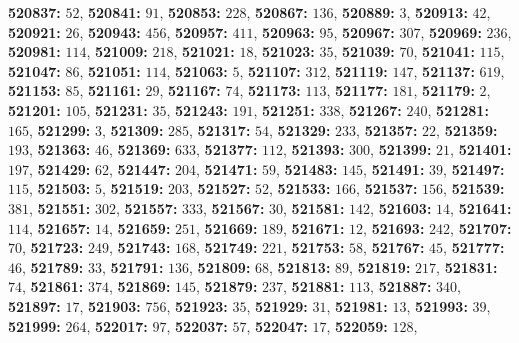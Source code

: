 \textsf{\bfseries 520837:} $52$, \textsf{\bfseries 520841:} $91$, \textsf{\bfseries 520853:} $228$, \textsf{\bfseries 520867:} $136$, \textsf{\bfseries 520889:} $3$, \textsf{\bfseries 520913:} $42$, \textsf{\bfseries 520921:} $26$, \textsf{\bfseries 520943:} $456$, \textsf{\bfseries 520957:} $411$, \textsf{\bfseries 520963:} $95$, \textsf{\bfseries 520967:} $307$, \textsf{\bfseries 520969:} $236$, \textsf{\bfseries 520981:} $114$, \textsf{\bfseries 521009:} $218$, \textsf{\bfseries 521021:} $18$, \textsf{\bfseries 521023:} $35$, \textsf{\bfseries 521039:} $70$, \textsf{\bfseries 521041:} $115$, \textsf{\bfseries 521047:} $86$, \textsf{\bfseries 521051:} $114$, \textsf{\bfseries 521063:} $5$, \textsf{\bfseries 521107:} $312$, \textsf{\bfseries 521119:} $147$, \textsf{\bfseries 521137:} $619$, \textsf{\bfseries 521153:} $85$, \textsf{\bfseries 521161:} $29$, \textsf{\bfseries 521167:} $74$, \textsf{\bfseries 521173:} $113$, \textsf{\bfseries 521177:} $181$, \textsf{\bfseries 521179:} $2$, \textsf{\bfseries 521201:} $105$, \textsf{\bfseries 521231:} $35$, \textsf{\bfseries 521243:} $191$, \textsf{\bfseries 521251:} $338$, \textsf{\bfseries 521267:} $240$, \textsf{\bfseries 521281:} $165$, \textsf{\bfseries 521299:} $3$, \textsf{\bfseries 521309:} $285$, \textsf{\bfseries 521317:} $54$, \textsf{\bfseries 521329:} $233$, \textsf{\bfseries 521357:} $22$, \textsf{\bfseries 521359:} $193$, \textsf{\bfseries 521363:} $46$, \textsf{\bfseries 521369:} $633$, \textsf{\bfseries 521377:} $112$, \textsf{\bfseries 521393:} $300$, \textsf{\bfseries 521399:} $21$, \textsf{\bfseries 521401:} $197$, \textsf{\bfseries 521429:} $62$, \textsf{\bfseries 521447:} $204$, \textsf{\bfseries 521471:} $59$, \textsf{\bfseries 521483:} $145$, \textsf{\bfseries 521491:} $39$, \textsf{\bfseries 521497:} $115$, \textsf{\bfseries 521503:} $5$, \textsf{\bfseries 521519:} $203$, \textsf{\bfseries 521527:} $52$, \textsf{\bfseries 521533:} $166$, \textsf{\bfseries 521537:} $156$, \textsf{\bfseries 521539:} $381$, \textsf{\bfseries 521551:} $302$, \textsf{\bfseries 521557:} $333$, \textsf{\bfseries 521567:} $30$, \textsf{\bfseries 521581:} $142$, \textsf{\bfseries 521603:} $14$, \textsf{\bfseries 521641:} $114$, \textsf{\bfseries 521657:} $14$, \textsf{\bfseries 521659:} $251$, \textsf{\bfseries 521669:} $189$, \textsf{\bfseries 521671:} $12$, \textsf{\bfseries 521693:} $242$, \textsf{\bfseries 521707:} $70$, \textsf{\bfseries 521723:} $249$, \textsf{\bfseries 521743:} $168$, \textsf{\bfseries 521749:} $221$, \textsf{\bfseries 521753:} $58$, \textsf{\bfseries 521767:} $45$, \textsf{\bfseries 521777:} $46$, \textsf{\bfseries 521789:} $33$, \textsf{\bfseries 521791:} $136$, \textsf{\bfseries 521809:} $68$, \textsf{\bfseries 521813:} $89$, \textsf{\bfseries 521819:} $217$, \textsf{\bfseries 521831:} $74$, \textsf{\bfseries 521861:} $374$, \textsf{\bfseries 521869:} $145$, \textsf{\bfseries 521879:} $237$, \textsf{\bfseries 521881:} $113$, \textsf{\bfseries 521887:} $340$, \textsf{\bfseries 521897:} $17$, \textsf{\bfseries 521903:} $756$, \textsf{\bfseries 521923:} $35$, \textsf{\bfseries 521929:} $31$, \textsf{\bfseries 521981:} $13$, \textsf{\bfseries 521993:} $39$, \textsf{\bfseries 521999:} $264$, \textsf{\bfseries 522017:} $97$, \textsf{\bfseries 522037:} $57$, \textsf{\bfseries 522047:} $17$, \textsf{\bfseries 522059:} $128$, 
